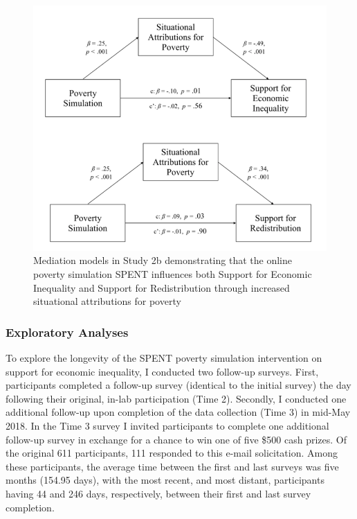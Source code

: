 \documentclass{sfuthesis}
\begin{document}
\begin{figure}[h]
  \includegraphics[width=\linewidth]{Fig3-1.png}
  \caption{Mediation models in Study 2b demonstrating that the online poverty simulation SPENT influences both Support for Economic Inequality and Support for Redistribution through increased situational attributions for poverty}
  \label{fig:thirdfig}
\end{figure}

\subsubsection{Exploratory Analyses}

To explore the longevity of the SPENT poverty simulation intervention on support for economic inequality, I conducted two follow-up surveys. First, participants completed a follow-up survey (identical to the initial survey) the day following their original, in-lab participation (Time 2). Secondly, I conducted one additional follow-up upon completion of the data collection (Time 3) in mid-May 2018. In the Time 3 survey I invited participants to complete one additional follow-up survey in exchange for a chance to win one of five \$500 cash prizes. Of the original 611 participants, 111 responded to this e-mail solicitation. Among these participants, the average time between the first and last surveys was five months (154.95 days), with the most recent, and most distant, participants having 44 and 246 days, respectively, between their first and last survey completion.
\end{document}
